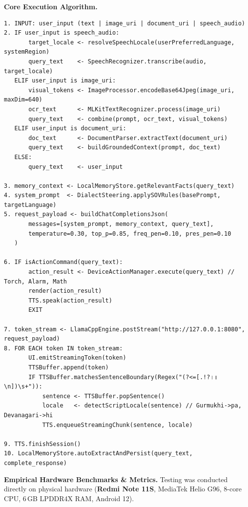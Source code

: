 \documentclass[11pt]{article}
\begin{document}
\textbf{Core Execution Algorithm.}
\begin{Verbatim}[fontsize=\small, frame=single, rulecolor=\color{ruleblue}]
1. INPUT: user_input (text | image_uri | document_uri | speech_audio)
2. IF user_input is speech_audio:
       target_locale <- resolveSpeechLocale(userPreferredLanguage, systemRegion)
       query_text    <- SpeechRecognizer.transcribe(audio, target_locale)
   ELIF user_input is image_uri:
       visual_tokens <- ImageProcessor.encodeBase64Jpeg(image_uri, maxDim=640)
       ocr_text      <- MLKitTextRecognizer.process(image_uri)
       query_text    <- combine(prompt, ocr_text, visual_tokens)
   ELIF user_input is document_uri:
       doc_text      <- DocumentParser.extractText(document_uri)
       query_text    <- buildGroundedContext(prompt, doc_text)
   ELSE:
       query_text    <- user_input

3. memory_context <- LocalMemoryStore.getRelevantFacts(query_text)
4. system_prompt  <- DialectSteering.applySOVRules(basePrompt, targetLanguage)
5. request_payload <- buildChatCompletionsJson(
       messages=[system_prompt, memory_context, query_text],
       temperature=0.30, top_p=0.85, freq_pen=0.10, pres_pen=0.10
   )

6. IF isActionCommand(query_text):
       action_result <- DeviceActionManager.execute(query_text) // Torch, Alarm, Math
       render(action_result)
       TTS.speak(action_result)
       EXIT

7. token_stream <- LlamaCppEngine.postStream("http://127.0.0.1:8080", request_payload)
8. FOR EACH token IN token_stream:
       UI.emitStreamingToken(token)
       TTSBuffer.append(token)
       IF TTSBuffer.matchesSentenceBoundary(Regex("(?<=[.!?।॥\n])\s+")):
           sentence <- TTSBuffer.popSentence()
           locale   <- detectScriptLocale(sentence) // Gurmukhi->pa, Devanagari->hi
           TTS.enqueueStreamingChunk(sentence, locale)

9. TTS.finishSession()
10. LocalMemoryStore.autoExtractAndPersist(query_text, complete_response)
\end{Verbatim}

\textbf{Empirical Hardware Benchmarks \& Metrics.} Testing was conducted directly on physical
hardware (\textbf{Redmi Note 11S}, MediaTek Helio G96, 8-core CPU, 6\,GB LPDDR4X RAM, Android 12).
\end{document}
